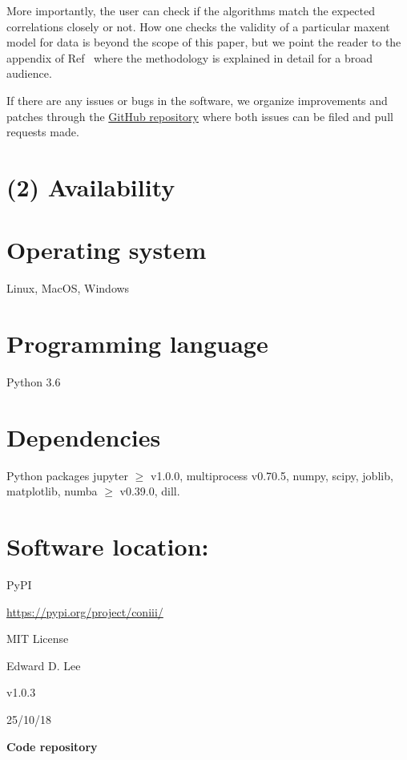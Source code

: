 \documentclass{jors}
\begin{document}
More importantly, the user can check if the algorithms match the expected correlations closely or not. How one checks the validity of a particular maxent model for data is beyond the scope of this paper, but we point the reader to the appendix of Ref~\cite{Lee:2015ev} where the methodology is explained in detail for a broad audience.

If there are any issues or bugs in the software, we organize improvements and patches through  the \href{https://github.com/eltrompetero/coniii}{GitHub repository} where both issues can be filed and pull requests made. 


\section*{(2) Availability}
\vspace{0.5cm}
\section*{Operating system}
Linux, MacOS, Windows

\section*{Programming language}
Python 3.6

\section*{Dependencies}
Python packages jupyter $\geq$ v1.0.0, multiprocess v0.70.5, numpy, scipy, joblib, matplotlib, numba $\geq$ v0.39.0, dill.

\section*{Software location:}
\begin{description}[noitemsep,topsep=0pt]
	\item[Name:] PyPI
	\item[Persistent identifier:] \url{https://pypi.org/project/coniii/}
	\item[Licence:] MIT License
	\item[Publisher:]  Edward D. Lee
	\item[Version published:] v1.0.3
	\item[Date published:] 25/10/18
\end{description}

{\bf Code repository}
\end{document}
